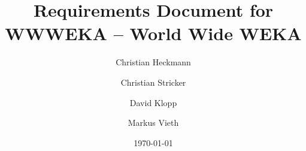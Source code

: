 \documentclass{book}
\title{Requirements Document for \\
WWWEKA -- World Wide WEKA} %
\author{Christian Heckmann \and Christian Stricker \and David Klopp \and Markus Vieth}
\date{\today}
\begin{document}


\maketitle

\tableofcontents





\printglossaries
\end{document}
